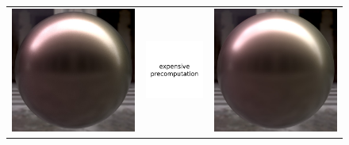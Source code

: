 \begin{figure}[t]
\begin{tabular}{ccc}
	    \includegraphics[width=0.315\columnwidth]{images/validations/compare2/sphere_layered_1024spp_37min.jpg} &
	    \includegraphics[width=0.315\columnwidth]{images/validations/compare2/na2.pdf} &
	    \includegraphics[width=0.315\columnwidth]{images/validations/compare2/sphere_laurent_1024spp_1_5min.jpg} \\


\end{tabular}
\end{figure}
